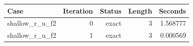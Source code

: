 {\small
\begin{tabular}{lrrrr}
\hline
Case & Iteration & Status & Length & Seconds \\
\hline
shallow\_r\_u\_f2 & 0 & exact & 3 & 1.568777 \\
shallow\_r\_u\_f2 & 1 & exact & 3 & 0.000569 \\
\hline
\end{tabular}
}
